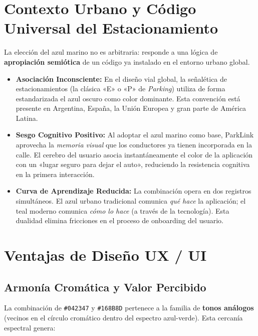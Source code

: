 \documentclass{estilo}
\begin{document}
\section{Contexto Urbano y Código Universal del Estacionamiento}

La elección del azul marino no es arbitraria: responde a una lógica de \textbf{apropiación semiótica} de un código ya instalado en el entorno urbano global.

\begin{itemize}[leftmargin=1.5em, itemsep=0.4em]
  \item \textbf{Asociación Inconsciente:} En el diseño vial global, la señalética de estacionamientos (la clásica «E» o «P» de \textit{Parking}) utiliza de forma estandarizada el azul oscuro como color dominante. Esta convención está presente en Argentina, España, la Unión Europea y gran parte de América Latina.

  \item \textbf{Sesgo Cognitivo Positivo:} Al adoptar el azul marino como base, ParkLink aprovecha la \textit{memoria visual} que los conductores ya tienen incorporada en la calle. El cerebro del usuario asocia instantáneamente el color de la aplicación con un «lugar seguro para dejar el auto», reduciendo la resistencia cognitiva en la primera interacción.

  \item \textbf{Curva de Aprendizaje Reducida:} La combinación opera en dos registros simultáneos. El azul urbano tradicional comunica \textit{qué hace} la aplicación; el teal moderno comunica \textit{cómo lo hace} (a través de la tecnología). Esta dualidad elimina fricciones en el proceso de onboarding del usuario.
\end{itemize}

\section{Ventajas de Diseño UX / UI}

\subsection{Armonía Cromática y Valor Percibido}

La combinación de \texttt{\#042347} y \texttt{\#168B8D} pertenece a la familia de \textbf{tonos análogos} (vecinos en el círculo cromático dentro del espectro azul-verde). Esta cercanía espectral genera:
\end{document}
